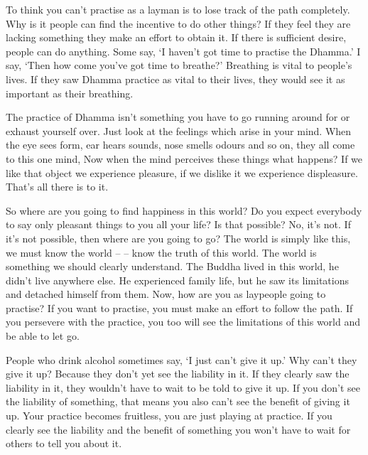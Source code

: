 To think you can't practise as a layman is to lose track of the path completely. Why is it people can find the incentive to do other things? If they feel they are lacking something they make an effort to obtain it. If there is sufficient desire, people can do anything. Some say, `I haven't got time to practise the Dhamma.' I say, `Then how come you've got time to breathe?' Breathing is vital to people's lives. If they saw Dhamma practice as vital to their lives, they would see it as important as their breathing.

The practice of Dhamma isn't something you have to go running around for or exhaust yourself over. Just look at the feelings which arise in your mind. When the eye sees form, ear hears sounds, nose smells odours and so on, they all come to this one mind,  Now when the mind perceives these things what happens? If we like that object we experience pleasure, if we dislike it we experience displeasure. That's all there is to it.

So where are you going to find happiness in this world? Do you expect everybody to say only pleasant things to you all your life? Is that possible? No, it's not. If it's not possible, then where are you going to go? The world is simply like this, we must know the world --  -- know the truth of this world. The world is something we should clearly understand. The Buddha lived in this world, he didn't live anywhere else. He experienced family life, but he saw its limitations and detached himself from them. Now, how are you as laypeople going to practise? If you want to practise, you must make an effort to follow the path. If you persevere with the practice, you too will see the limitations of this world and be able to let go.

People who drink alcohol sometimes say, `I just can't give it up.' Why can't they give it up? Because they don't yet see the liability in it. If they clearly saw the liability in it, they wouldn't have to wait to be told to give it up. If you don't see the liability of something, that means you also can't see the benefit of giving it up. Your practice becomes fruitless, you are just playing at practice. If you clearly see the liability and the benefit of something you won't have to wait for others to tell you about it. 

